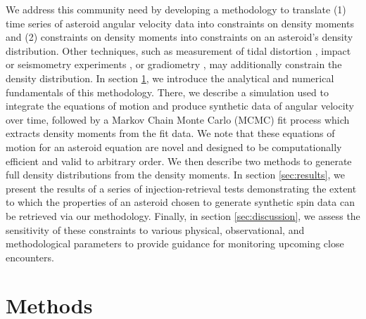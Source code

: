 \documentclass[fleqn,usenatbib]{mnras}
\begin{document}
We address this community need by developing a methodology to translate (1) time series of asteroid angular velocity data into constraints on density moments and (2) constraints on density moments into constraints on an asteroid's density distribution. Other techniques, such as measurement of tidal distortion \cite{RICHARDSON199847}, impact or seismometry experiments \cite{RICHARDSON2005325}, or gradiometry \cite{carroll2018tidal}, may additionally constrain the density distribution. In section \ref{sec:methods}, we introduce the analytical and numerical fundamentals of this methodology. There, we describe a simulation used to integrate the equations of motion and produce synthetic data of angular velocity over time, followed by a Markov Chain Monte Carlo (MCMC) fit process which  extracts density moments from the fit data. We note that these equations of motion for an asteroid equation are novel and designed to be computationally efficient and valid to arbitrary order. We then describe two methods to generate full density distributions from the density moments. In section \ref{sec:results}, we present the results of a series of injection-retrieval tests demonstrating the extent to which the properties of an asteroid chosen to generate synthetic spin data can be retrieved via our methodology. Finally, in section \ref{sec:discussion}, we assess the sensitivity of these constraints to various physical, observational, and methodological parameters to provide guidance for monitoring upcoming close encounters.





\section{Methods}
\label{sec:methods}
\end{document}
